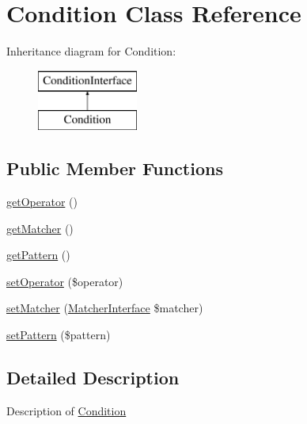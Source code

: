 \hypertarget{class_pes_1_1_query_1_1_condition}{}\section{Condition Class Reference}
\label{class_pes_1_1_query_1_1_condition}
Inheritance diagram for Condition\+:\begin{figure}[H]
\begin{center}
\leavevmode
\includegraphics[height=2.000000cm]{class_pes_1_1_query_1_1_condition}
\end{center}
\end{figure}
\subsection*{Public Member Functions}
\begin{DoxyCompactItemize}
\item 
\mbox{\hyperlink{class_pes_1_1_query_1_1_condition_aeb1d8b550b38454a92508c857b043df5}{get\+Operator}} ()
\item 
\mbox{\hyperlink{class_pes_1_1_query_1_1_condition_aad4538bdde7e273b32661681773c32f0}{get\+Matcher}} ()
\item 
\mbox{\hyperlink{class_pes_1_1_query_1_1_condition_a86d92279529520a45589a56c2247355e}{get\+Pattern}} ()
\item 
\mbox{\hyperlink{class_pes_1_1_query_1_1_condition_af7996c125b44ce3a42130ccc56edf9f4}{set\+Operator}} (\$operator)
\item 
\mbox{\hyperlink{class_pes_1_1_query_1_1_condition_a0d9ceb80245da7ba5be1dbcee4d98a4e}{set\+Matcher}} (\mbox{\hyperlink{interface_pes_1_1_query_1_1_matcher_1_1_matcher_interface}{Matcher\+Interface}} \$matcher)
\item 
\mbox{\hyperlink{class_pes_1_1_query_1_1_condition_a36b6c101a93edd2abc86e7fc4507b5fa}{set\+Pattern}} (\$pattern)
\end{DoxyCompactItemize}


\subsection{Detailed Description}
Description of \mbox{\hyperlink{class_pes_1_1_query_1_1_condition}{Condition}}

